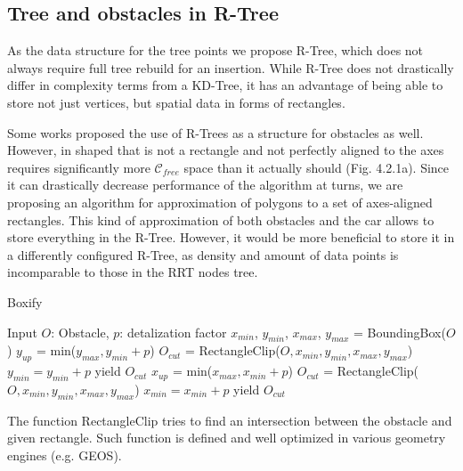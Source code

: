 \documentclass[a4paper,12pt]{article}
\DeclareRobustCommand{\[}{\begin{equation}}
\DeclareRobustCommand{\]}{\end{equation}}
\numberwithin{equation}{section}
\numberwithin{algorithm}{subsection}
\begin{document}
\subsection{Tree and obstacles in R-Tree}

As the data structure for the tree points we propose R-Tree, which does not always require full tree rebuild for an insertion.
While R-Tree does not drastically differ in complexity terms from a KD-Tree, it has an advantage of being able to store not just vertices,
but spatial data in forms of rectangles.

Some works proposed the use of R-Trees as a structure for obstacles as well. However, in shaped that is not a rectangle and not perfectly aligned to the axes requires significantly
more $\mathcal{C}_{free}$ space than it actually should (Fig. 4.2.1a). Since it can drastically decrease performance of the algorithm at turns, we are proposing an algorithm for
approximation of polygons to a set of axes-aligned rectangles. This kind of approximation of both obstacles and the car allows to store everything in the R-Tree. However, it would be more beneficial to store it in a differently configured R-Tree,
as density and amount of data points is incomparable to those in the RRT nodes tree.

\begin{algorithm}[H]
    \caption{Boxify}
    \begin{algorithmic}[1]
    \State Input $O$: Obstacle, $p$: detalization factor 
    \State $x_{min}$, $y_{min}$, $x_{max}$, $y_{max}$ = BoundingBox($O$)
    \State $y_{up}$ = min($y_{max}, y_{min}+p$)
    \State $O_{cut}$ = RectangleClip($O, x_{min}, y_{min}, x_{max}, y_{max}$)
    \State $y_{min} = y_{min} + p$
    \State yield $O_{cut}$
    \EndWhile
    \Else
    \State $x_{up}$ = min($x_{max}, x_{min}+p$)
    \State $O_{cut}$ = RectangleClip($O, x_{min}, y_{min}, x_{max}, y_{max}$)
    \State $x_{min} = x_{min} + p$
    \State yield $O_{cut}$
    \EndWhile
    \EndIf
    \end{algorithmic}
\end{algorithm}

The function RectangleClip tries to find an intersection between the obstacle and given rectangle. Such function is defined and well optimized in various geometry engines (e.g. GEOS).
\end{document}

